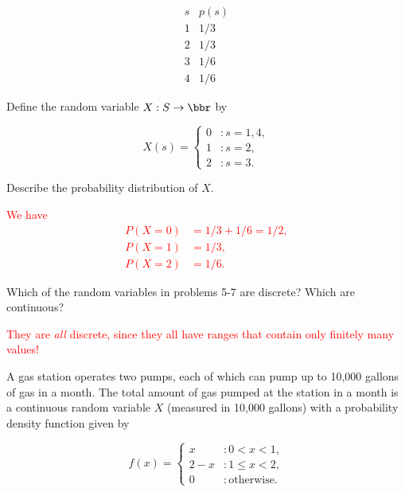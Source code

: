 \documentclass[12pt,reqno]{amsart}
\begin{document}
    \[
    \begin{array}{c|c}
    s & p(s) \\ \hline
    1 & 1/3\\
    2 & 1/3\\
    3 & 1/6\\
    4 & 1/6
    \end{array}
    \]

Define the random variable $X:S\to \bbr$ by

    \[X(s) = \begin{cases}
    0 & : s = 1, 4, \\
    1 & : s=2, \\
    2 & : s=3.
    \end{cases}\]

Describe the probability distribution of $X$.

\bigskip
\textcolor{red}{We have
    \begin{align*}
    P(X=0) &= 1/3 + 1/6 = 1/2, \\
    P(X=1) &= 1/3, \\
    P(X=2) &= 1/6.
    \end{align*}}










\bigskip
\prob Which of the random variables in problems 5-7 are discrete? Which are continuous?

\bigskip
\textcolor{red}{They are \textit{all} discrete, since they all have ranges that contain only finitely many values!}













\bigskip
\prob A gas station operates two pumps, each of which can pump up to 10,000 gallons of gas in a month. The total amount of gas pumped at the station in a month is a continuous random variable $X$ (measured in 10,000 gallons) with a probability density function given by

    \[f(x) = \begin{cases}
        x & : 0 < x < 1, \\
        2-x & : 1 \leq x < 2, \\
        0 & : \text{otherwise}.
    \end{cases}\]
\end{document}
